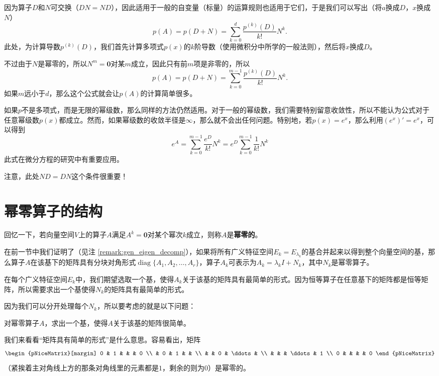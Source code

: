 因为算子$D$和$N$可交换（$DN=ND$），因此适用于一般的自变量（标量）的运算规则也适用于它们，于是我们可以写出（将$a$换成$D$，$x$换成$N$）
\[p(A)=p(D+N)=\sum_{k=0}^{d}{\frac{p^{(k)}(D)}{k!}}N^{k}.\]
此处，为计算导数$p^{(k)}(D)$，我们首先计算多项式$p(x)$的$k$阶导数（使用微积分中所学的一般法则），然后将$x$换成$D$。

不过由于$N$是幂零的，所以$N^m=\mathbf{0}$对某$m$成立，因此只有前$m$项是非零的，所以
\[p(A)=p(D+N)=\sum_{k=0}^{m-1}{\frac{p^{(k)}(D)}{k!}}N^{k}.\]
如果$m$远小于$d$，那么这个公式就会让$p(A)$的计算简单很多。

如果$p$不是多项式，而是无限的幂级数，那么同样的方法仍然适用。对于一般的幂级数，我们需要特别留意收敛性，所以不能认为公式对于任意幂级数$p(x)$都成立。然而，如果幂级数的收敛半径是$\infty$，那么就不会出任何问题。特别地，若$p(x)=e^x$，那么利用$(e^x)'=e^x$，可以得到
\[e^A=\sum_{k=0}^{m-1}\frac{e^D}{k!}N^k=e^D\sum_{k=0}^{m-1}\frac{1}{k!}N^k\]
此式在微分方程的研究中有重要应用。

注意，此处$ND=DN$这个条件很重要！

\section{幂零算子的结构}

回忆一下，若向量空间$V$上的算子$A$满足$A^k=\mathbf{0}$对某个幂次$k$成立，则称$A$是{\bf 幂零的}。

在前一节中我们证明了（见注 \ref{remark:gen_eigen_decomp}），如果将所有广义特征空间$E_k=E_{\lambda_k}$的基合并起来以得到整个向量空间的基，那么算子$A$在该基下的矩阵具有分块对角形式$\operatorname{diag}\{A_1,A_2,\dots,A_r\}$，算子$A_k$可表示为$A_k=\lambda_k I+N_k$，其中$N_k$是幂零算子。

在每个广义特征空间$E_k$中，我们期望选取一个基，使得$A_k$关于该基的矩阵具有最简单的形式。因为恒等算子在任意基下的矩阵都是恒等矩阵，所以需要求出一个基使得$N_k$的矩阵具有最简单的形式。

因为我们可以分开处理每个$N_k$，所以要考虑的就是以下问题：

\begin{center}
    对幂零算子$A$，求出一个基，使得$A$关于该基的矩阵很简单。
\end{center}

我们来看看“矩阵具有简单的形式”是什么意思。容易看出，矩阵
\begin{equation}\label{jordan_block}
    \begin{pNiceMatrix}[margin]
        0 & 1 &   &        & 0   \\
          & 0 & 1 &        &    \\
          &   & 0 & \ddots &    \\
          &   &   & \ddots & 1   \\
        0 &   &   &        & 0
    \end{pNiceMatrix}
\end{equation}
（紧挨着主对角线上方的那条对角线里的元素都是$1$，剩余的则为$0$）是幂零的。

